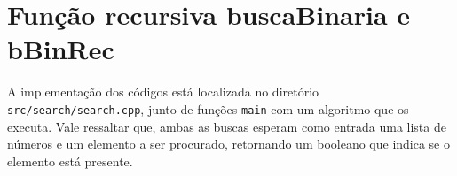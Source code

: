 \section{Função recursiva buscaBinaria e bBinRec}
A implementação dos códigos está localizada no diretório \texttt{src/search/search.cpp}, junto de funções \texttt{main} com um algoritmo que os executa. Vale ressaltar que, ambas as buscas esperam como entrada uma lista de números e um elemento a ser procurado, retornando um booleano que indica se o elemento está presente.

